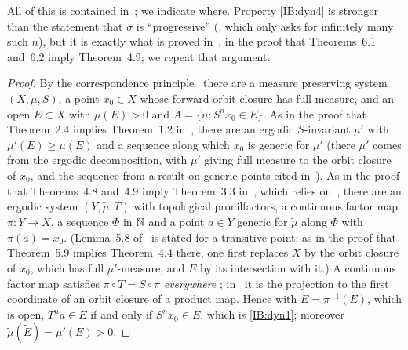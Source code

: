 All of this is contained in~\cite{kra2025density}; we indicate where. Property
\ref{IB:dyn4} is stronger than the statement that $\sigma$ is ``progressive''
(\cite[Definition~3.1]{kra2025density}, which only asks for infinitely many such
$n$), but it is exactly what is proved in~\cite{kra2025density}, in the proof that
Theorems~6.1 and~6.2 imply Theorem~4.9; we repeat that argument.

\begin{proof}
By the correspondence principle~\cite[Theorem~2.3]{kra2025density} there are a
measure preserving system $(X,\mu,S)$, a point $x_0\in X$ whose forward orbit
closure has full measure, and an open $E\subset X$ with $\mu(E)>0$ and
$A=\{n: S^nx_0\in E\}$. As in the proof that Theorem~2.4 implies Theorem~1.2
in~\cite{kra2025density}, there are an ergodic $S$-invariant $\mu'$ with $\mu'(E)\ge\mu(E)$
and a \Fol{} sequence along which $x_0$ is generic for $\mu'$ (there $\mu'$ comes from the ergodic
decomposition, with $\mu'$ giving full measure to the orbit closure of $x_0$, and the \Fol{}
sequence from a result on generic points cited in~\cite{kra2025density}). As in the proof that Theorems~4.8 and~4.9 imply Theorem~3.3
in~\cite{kra2025density}, which relies on~\cite[Proposition~5.7 and
Lemma~5.8]{kra2022infinite}, there are an ergodic system $(Y,\tilde\mu,T)$ with
topological pronilfactors, a continuous factor map $\pi\colon Y\to X$, a \Fol{}
sequence $\Phi$ in $\mathbb{N}$ and a point $a\in Y$ generic for $\tilde\mu$ along $\Phi$ with
$\pi(a)=x_0$. (Lemma~5.8 of~\cite{kra2022infinite} is stated for a transitive
point; as in the proof that Theorem~5.9 implies Theorem~4.4 there, one first replaces $X$ by the orbit
closure of $x_0$, which has full $\mu'$-measure, and $E$ by its intersection with
it.) A continuous factor map satisfies $\pi\circ T=S\circ\pi$ \emph{everywhere}
\cite[Definition~2.2]{kra2022infinite}; in~\cite[Lemma~5.8]{kra2022infinite} it is
the projection to the first coordinate of an orbit closure of a product map.
Hence with $\tilde E=\pi^{-1}(E)$, which is open, $T^na\in\tilde E$ if and only if
$S^nx_0\in E$, which is \ref{IB:dyn1}; moreover $\tilde\mu(\tilde E)=\mu'(E)>0$.


\end{proof}
